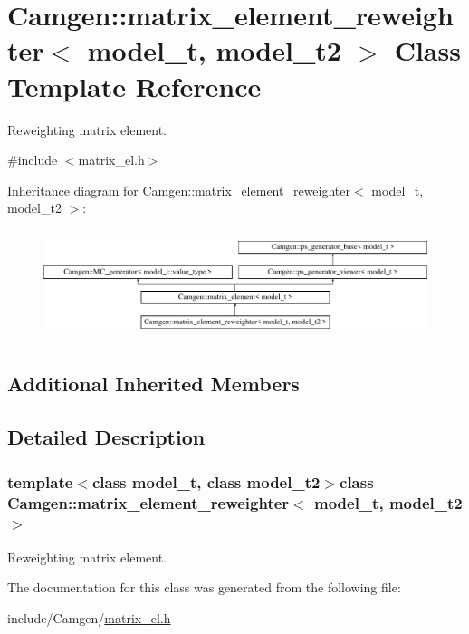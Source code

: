 \hypertarget{a00360}{\section{Camgen\-:\-:matrix\-\_\-element\-\_\-reweighter$<$ model\-\_\-t, model\-\_\-t2 $>$ Class Template Reference}
\label{a00360}
}


Reweighting matrix element.  




{\ttfamily \#include $<$matrix\-\_\-el.\-h$>$}

Inheritance diagram for Camgen\-:\-:matrix\-\_\-element\-\_\-reweighter$<$ model\-\_\-t, model\-\_\-t2 $>$\-:\begin{figure}[H]
\begin{center}
\leavevmode
\includegraphics[height=3.218391cm]{a00360}
\end{center}
\end{figure}
\subsection*{Additional Inherited Members}


\subsection{Detailed Description}
\subsubsection*{template$<$class model\-\_\-t, class model\-\_\-t2$>$class Camgen\-::matrix\-\_\-element\-\_\-reweighter$<$ model\-\_\-t, model\-\_\-t2 $>$}

Reweighting matrix element. 

The documentation for this class was generated from the following file\-:\begin{DoxyCompactItemize}
\item 
include/\-Camgen/\hyperlink{a00669}{matrix\-\_\-el.\-h}\end{DoxyCompactItemize}
